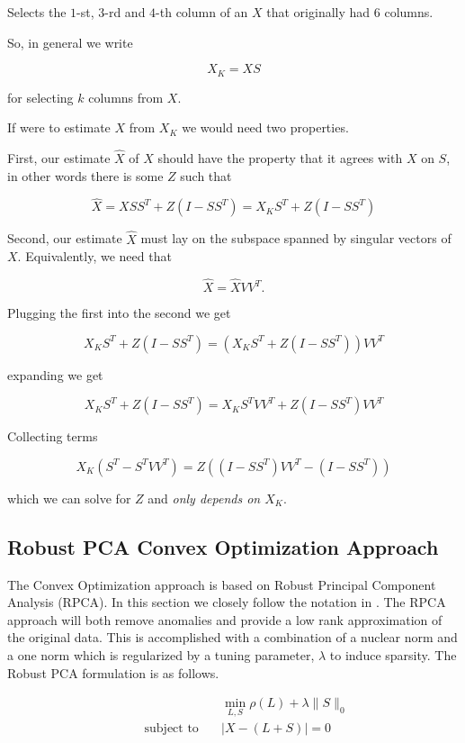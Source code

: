 \documentclass[conference]{IEEEtran}
\begin{document}
Selects the $1$-st, $3$-rd and $4$-th column of an $X$ that originally had $6$ columns.

So, in general we write 

$$X_K = X S$$

for selecting $k$ columns from $X$.

If were to estimate $X$ from $X_K$ we would need two properties.

First, our estimate $\hat{X}$ of $X$ should have the property that it agrees with $X$ on $S$, in other words there is some $Z$ such that

$$
\hat{X} = X S S^T + Z (I-S S^T) = X_K S^T + Z (I-S S^T)
$$

Second, our estimate $\hat{X}$ must lay on the subspace spanned by singular vectors of $X$.  Equivalently, we need that

$$
\hat{X} = \hat{X} V V^T.
$$

Plugging the first into the second we get

$$
X_K S^T + Z (I-S S^T) = (X_K S^T + Z (I-S S^T)) V V^T 
$$

expanding we get 

$$
X_K S^T + Z (I-S S^T) = X_K S^T V V^T + Z (I-S S^T)V V^T
$$

Collecting terms

$$
X_K (S^T - S^T V V^T) = Z ((I-S S^T)V V^T - (I-S S^T))
$$

which we can solve for $Z$ and \emph{only depends on $X_K$}.

\subsection{Robust PCA Convex Optimization Approach}
The Convex Optimization approach is based on Robust Principal Component Analysis (RPCA). In this section we closely follow the notation in \cite{Paffenroth2012a,Paffenroth2013b,paffenroth2018robust}. The RPCA approach will both remove anomalies and provide a low rank approximation of the original data. This is accomplished with a combination of a nuclear norm and a one norm which is regularized by a tuning parameter, $\lambda$ to induce sparsity. The Robust PCA formulation is as follows.

\begin{align} \label{RPCA}
  &\min_{L,S}\rho(L)+\lambda\|S\|_{0}\\ \nonumber
  \qquad \text{subject to} \quad &
                                   |X-(L+S)| = 0
\end{align}
\end{document}
